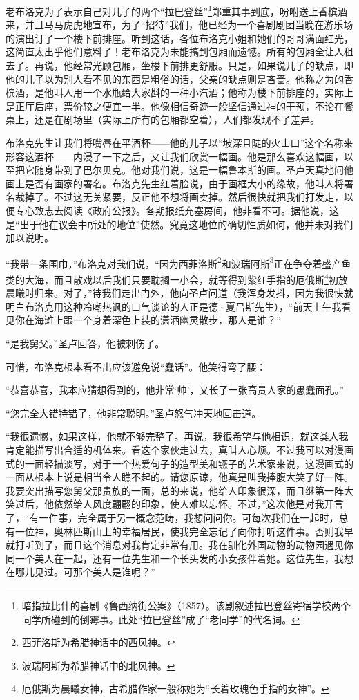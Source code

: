\par 老布洛克为了表示自己对儿子的两个“拉巴登丝”\footnote{暗指拉比什的喜剧《鲁西纳街公案》（1857）。该剧叙述拉巴登丝寄宿学校两个同学所碰到的倒霉事。此处“拉巴登丝”成了“老同学”的代名词。}郑重其事到底，吩咐送上香槟酒来，并且马马虎虎地宣布，为了“招待”我们，他已经为一个喜剧剧团当晚在游乐场的演出订了一个楼下前排座。听到这话，各位布洛克小姐和她们的哥哥满面红光，这简直太出乎他们意料了！老布洛克为未能搞到包厢而遗憾。所有的包厢全让人租去了。再说，他经常光顾包厢，坐楼下前排更舒服。只是，如果说儿子的缺点，即他的儿子以为别人看不见的东西是粗俗的话，父亲的缺点则是吝啬。他称之为的香槟酒，是他叫人用一个水瓶给大家斟的一种小汽酒；他称为楼下前排座的，实际上是正厅后座，票价较之便宜一半。他像相信奇迹一般坚信通过神的干预，不论在餐桌上，还是在剧场里（实际上所有的包厢都空着），人们都发现不了差异。
\par 布洛克先生让我们将嘴唇在平酒杯——他的儿子以“坡深且陡的火山口”这个名称来形容这酒杯——内浸了一下之后，又让我们欣赏一幅画。他是那么喜欢这幅画，以至把它随身带到了巴尔贝克。他对我们说，这是一幅鲁本斯的画。圣卢天真地问他画上是否有画家的署名。布洛克先生红着脸说，由于画框大小的缘故，他叫人将署名裁掉了。不过这无关紧要，反正他不想将画卖掉。然后很快就把我们打发走，以便专心致志去阅读《政府公报》。各期报纸充塞房间，他非看不可。据他说，这是“出于他在议会中所处的地位”使然。究竟这地位的确切性质如何，他并未对我们加以说明。
\par “我带一条围巾，”布洛克对我们说，“因为西菲洛斯\footnote{西菲洛斯为希腊神话中的西风神。}和波瑞阿斯\footnote{波瑞阿斯为希腊神话中的北风神。}正在争夺着盛产鱼类的大海，而且散戏以后我们只要耽搁一小会，就等得到紫红手指的厄俄斯\footnote{厄俄斯为晨曦女神，古希腊作家一般称她为“长着玫瑰色手指的女神”。}初放晨曦时归来。对了，”待我们走出门外，他向圣卢问道（我浑身发抖，因为我很快就明白布洛克用这种冷嘲热讽的口气谈论的人正是德·夏吕斯先生），“前天上午我看见你在海滩上跟一个身着深色上装的潇洒幽灵散步，那人是谁？”
\par “是我舅父。”圣卢回答，他被刺伤了。
\par 可惜，布洛克根本看不出应该避免说“蠢话”。他笑得弯了腰：
\par “恭喜恭喜，我本应猜想得到的，他非常‘帅’，又长了一张高贵人家的愚蠢面孔。”
\par “您完全大错特错了，他非常聪明。”圣卢怒气冲天地回击道。
\par “我很遗憾，如果这样，他就不够完整了。再说，我很希望与他相识，就这类人我肯定能描写出合适的机体来。看这个家伙走过去，真叫人心烦。不过我可以对漫画式的一面轻描淡写，对于一个热爱句子的造型美和镢子的艺术家来说，这漫画式的一面从根本上说是相当令人瞧不起的。请您原谅，他真是叫我捧腹大笑了好一阵。我要突出描写您舅父那贵族的一面，总的来说，他给人印象很深，而且继第一阵大笑过后，他依然给人风度翩翩的印象，使人难以忘怀。不过，”这次他是对我开言了，“有一件事，完全属于另一概念范畴，我想问问你。可每次我们在一起时，总有一位神，奥林匹斯山上的幸福居民，使我完全忘记了向你打听这件事。否则我早就打听到了，而且这个消息对我肯定非常有用。我在驯化外国动物的动物园遇见你同一个美人在一起，还有一位先生和一个长头发的小女孩伴着她。这位先生，我想在哪儿见过。可那个美人是谁呢？”
